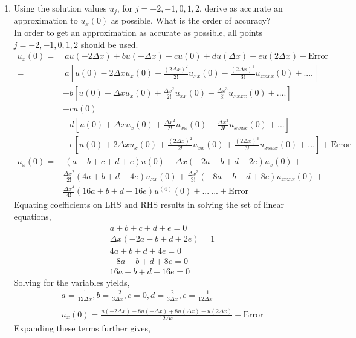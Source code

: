 \documentclass[11pt]{article}
\newcommand{\dx}{\Delta x}
\newcommand{\ux}{u_x(0)}
\newcommand{\uxx}{u_{xx}(0)}
\newcommand{\uxxx}{u_{xxxx}(0)}
\newcommand{\ufour}{u^{(4)}(0)}
\begin{document}
\begin{enumerate}
\begin{enumerate}
    \item {\color{blue}Using the solution values }$u_j$, {\color{blue}for} $j=-2,-1,0,1,2$, {\color{blue}derive as accurate an approximation to }$u_{x}(0)$ {\color{blue}as possible. What is the order of accuracy?} \\
    
    In order to get an approximation as accurate as possible, all points $j = -2,-1,0,1,2$ should be used.
    \begin{align*}
    \ux = & \ au(-2\dx) + bu(-\dx) + cu(0) + du(\dx) + eu(2\dx) + \text{Error} \\
    = &  \ a\left[u(0) -2\dx\ux + \frac{(2\dx)^2}{2!}\uxx - \frac{(2\dx)^3}{3!}\uxxx + .... \right] \\
    & + b\left[u(0) -\dx\ux + \frac{\dx^2}{2!}\uxx -\frac{\dx^3}{3!}\uxxx + .... \right] \\
    & + cu(0) \\
    & + d\left[u(0) + \dx\ux + \frac{\dx^2}{2!}\uxx + \frac{\dx^3}{3!}\uxxx + ...\right] \\
    & + e\left[u(0) + 2\dx\ux + \frac{(2\dx)^2}{2!}\uxx + \frac{(2\dx)^3}{3!}\uxxx + ... \right] + \text{Error} \\
    \ux = & \ \left(a+b+c+d+e\right)u(0) + \dx\left(-2a-b+d+2e\right)\ux + \\
    & \frac{\dx^2}{2!}\left(4a+b+d+4e\right)\uxx + \frac{\dx^3}{3!}\left(-8a-b+d+8e\right)\uxxx + \\
    & \frac{\dx^4}{4!}\left(16a+b+d+16e\right)\ufour + ... \ ... + \text{Error}
    \end{align*}
   Equating coefficients on LHS and RHS results in solving the set of linear equations, 
   \begin{align*}
   & a+b+c+d+e = 0 \\
   & \dx \left(-2a-b+d+2e\right) = 1\\
   & 4a+b+d+4e = 0 \\
   & -8a-b+d+8e = 0 \\
   & 16a +b+d+16e = 0 
   \end{align*} 
   Solving for the variables yields, 
   \begin{align*}
    &  a = \frac{1}{12\dx} , b = \frac{-2}{3\dx} , c = 0 , d = \frac{2}{3\dx} , e = \frac{-1}{12\dx} \\ \\
   & \ux = \frac{u(-2\dx)-8u(-\dx)+ 8u(\dx) - u(2\dx)}{12\dx} + \text{Error} 
   \end{align*}
   Expanding these terms further gives,
   \begin{align*}

\end{align*}
\end{enumerate}
\end{enumerate}
\end{document}

